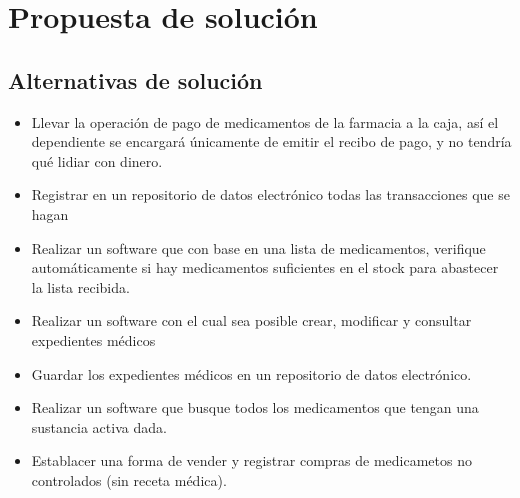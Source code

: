 
\section{Propuesta de solución}

\subsection{Alternativas de solución}

\begin{itemize}
\item Llevar la operaci\'on de pago de medicamentos de la farmacia a la caja, as\'i el dependiente se encargar\'a \'unicamente de emitir el recibo de pago, y no tendr\'ia qu\'e lidiar con dinero.
\item Registrar en un repositorio de datos electr\'onico todas las transacciones que se hagan
\item Realizar un software que con base en una lista de medicamentos, verifique autom\'aticamente si hay medicamentos suficientes en el stock para abastecer la lista recibida.
\item Realizar un software con el cual sea posible crear, modificar y consultar expedientes m\'edicos
\item Guardar los expedientes m\'edicos en un repositorio de datos electr\'onico.
\item Realizar un software que busque todos los medicamentos que tengan una sustancia activa dada.
\item Establacer una forma de vender y registrar compras de medicametos no controlados (sin receta m\'edica).
\end{itemize}
